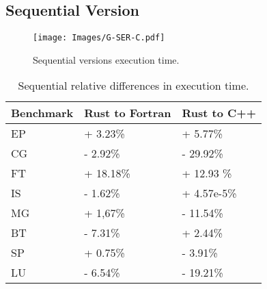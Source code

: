 

    \subsection{Sequential Version}\label{sec:seq}

    \begin{figure}[t]
        \centering
        \texttt{[image: Images/G-SER-C.pdf]}
        \caption{Sequential versions execution time.}
        \label{fig:sertimes}
        \end{figure}

        \begin{table}[t]
        \scriptsize
        \centering
        \caption{Sequential relative differences in execution time.}
        \begin{tabular}{C{1.5cm}|C{2.5cm}C{2.5cm}} 
            \toprule
            Benchmark & Rust to Fortran & Rust to C++ \\ %
            \midrule
            EP  &  + 3.23\% &  + 5.77\%  \\
            CG  &  - 2.92\% &  - 29.92\%  \\
            FT  &  + 18.18\% &  + 12.93 \%  \\
            IS  &  - 1.62\% &  + 4.57e-5\%  \\
            MG  &  + 1,67\% &  - 11.54\%  \\
            BT  &  - 7.31\% &  + 2.44\%  \\
            SP  &  + 0.75\% &  - 3.91\%  \\
            LU  &  - 6.54\% &  - 19.21\%  \\
            \bottomrule
        \end{tabular}
        \label{tab:relativeseq}
        \end{table}

